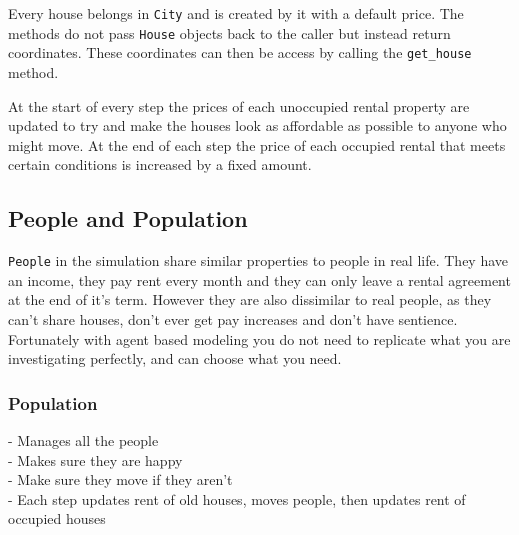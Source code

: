 \par
Every house belongs in \texttt{City} and is created by it with a default price. The methods do not pass \texttt{House} objects back to the caller but instead return coordinates. These coordinates can then be access by calling the \texttt{get\_house} method.

\par
At the start of every step the prices of each unoccupied rental property are updated to try and make the houses look as affordable as possible to anyone who might move. At the end of each step the price of each occupied rental that meets certain conditions is increased by a fixed amount.

\subsection{People and Population}

\par
\texttt{People} in the simulation share similar properties to people in real life. They have an income, they pay rent every month and they can only leave a rental agreement at the end of it's term. However they are also dissimilar to real people, as they can't share houses, don't ever get pay increases and don't have sentience. Fortunately with agent based modeling you do not need to replicate what you are investigating perfectly, and can choose what you need.

\subsubsection{Population}
\par
- Manages all the people \\
- Makes sure they are happy \\
- Make sure they move if they aren't \\
- Each step updates rent of old houses, moves people, then updates rent of occupied houses \\